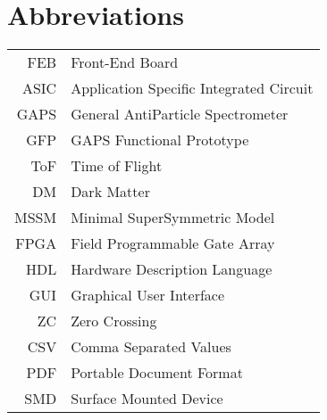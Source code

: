 \chapter*{Abbreviations} 

\begin{longtable}{rl}
    FEB & Front-End Board\\
    ASIC & Application Specific Integrated Circuit\\
    GAPS & General AntiParticle Spectrometer\\
    GFP & GAPS Functional Prototype\\
    ToF & Time of Flight\\
    DM & Dark Matter\\
    MSSM & Minimal SuperSymmetric Model\\
    FPGA & Field Programmable Gate Array\\
    HDL & Hardware Description Language\\
    GUI & Graphical User Interface\\
    ZC & Zero Crossing\\
    CSV & Comma Separated Values\\
    PDF & Portable Document Format\\
    SMD & Surface Mounted Device\\
\end{longtable}